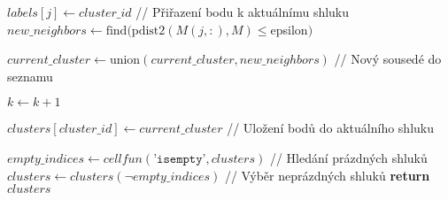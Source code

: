 \begin{algorithm}
\begin{algorithmic}[1]
                    \STATE $labels[j] \gets cluster\_id$ // Přiřazení bodu k aktuálnímu shluku
                    \STATE $new\_neighbors \gets \text{find}(\text{pdist2}(M(j, :), M) \leq $epsilon$)$

                        \STATE $current\_cluster \gets \text{union}(current\_cluster, new\_neighbors)$ // Nový sousedé do seznamu
                    \ENDIF
                \ENDIF

                \STATE $k \gets k + 1$
            \ENDWHILE

            \STATE $clusters[cluster\_id] \gets current\_cluster$ // Uložení bodů do aktuálního shluku
        \ENDFOR

        \STATE $empty\_indices \gets \textit{cellfun}(\texttt{'isempty'}, clusters)$ // Hledání prázdných shluků
        \STATE $clusters \gets clusters(\neg empty\_indices)$ // Výběr neprázdných shluků
        \STATE \textbf{return} $clusters$
    \end{algorithmic}
\end{algorithm}